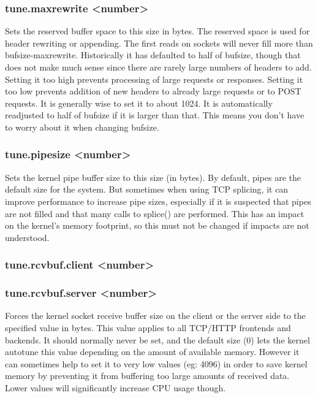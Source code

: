 \subsubsection[tune.maxrewrite]{tune.maxrewrite <number>}
  Sets the reserved buffer space to this size in bytes. The reserved space is
  used for header rewriting or appending. The first reads on sockets will never
  fill more than bufsize-maxrewrite. Historically it has defaulted to half of
  bufsize, though that does not make much sense since there are rarely large
  numbers of headers to add. Setting it too high prevents processing of large
  requests or responses. Setting it too low prevents addition of new headers
  to already large requests or to POST requests. It is generally wise to set it
  to about 1024. It is automatically readjusted to half of bufsize if it is
  larger than that. This means you don't have to worry about it when changing
  bufsize.

\subsubsection[tune.pipesize]{tune.pipesize <number>}
  Sets the kernel pipe buffer size to this size (in bytes). By default, pipes
  are the default size for the system. But sometimes when using TCP splicing,
  it can improve performance to increase pipe sizes, especially if it is
  suspected that pipes are not filled and that many calls to splice() are
  performed. This has an impact on the kernel's memory footprint, so this must
  not be changed if impacts are not understood.

\subsubsection[tune.rcvbuf.client]{tune.rcvbuf.client <number>}
\subsubsection[tune.rcvbuf.server]{tune.rcvbuf.server <number>}
  Forces the kernel socket receive buffer size on the client or the server side
  to the specified value in bytes. This value applies to all TCP/HTTP frontends
  and backends. It should normally never be set, and the default size (0) lets
  the kernel autotune this value depending on the amount of available memory.
  However it can sometimes help to set it to very low values (eg: 4096) in
  order to save kernel memory by preventing it from buffering too large amounts
  of received data. Lower values will significantly increase CPU usage though.

